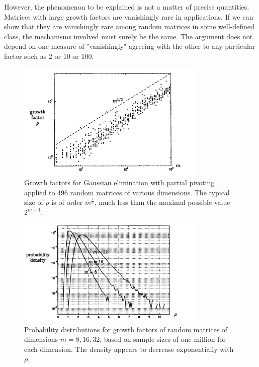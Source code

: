However, the phenomenon to be explained is not a matter of precise quantities. Matrices with large growth factors are vanishingly rare in applications. If we can show that they are vanishingly rare among random matrices in some well-defined class, the mechanisms involved must surely be the same. The argument does not depend on one measure of "vanishingly" agreeing with the other to any particular factor such as 2 or 10 or 100.

\begin{figure}[H]
    \centering
    \includegraphics[width=0.8\textwidth]{figures/22-1.png}
    \caption{Growth factors for Gaussian elimination with partial pivoting applied to 496 random matrices of various dimensions. The typical size of $\rho$ is of order $m^{\frac{1}{2}}$, much less than the maximal possible value $2^{m-1}$.}
    \label{fig 22.1}
\end{figure}

\begin{figure}[H]
    \centering
    \includegraphics[width=0.8\textwidth]{figures/22-2.png}
    \caption{ Probability distributions for growth factors of random matrices of dimensions $m=8,16,32$, based on sample sizes of one million for each dimension. The density appears to decrease exponentially with $\rho$.}
    \label{fig: 22.2}
\end{figure}

